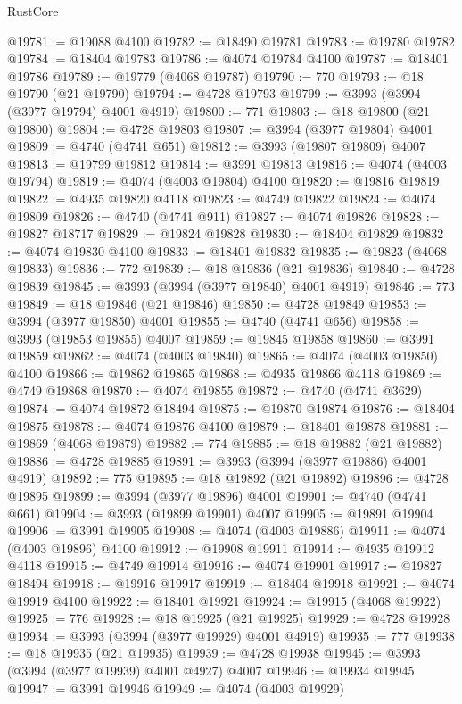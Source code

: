 \begin{lexlean}{RustCore}
\begin{coremodule}
@19781 := @19088 @4100
@19782 := @18490 @19781
@19783 := @19780 @19782
@19784 := @18404 @19783
@19786 := @4074 @19784 @4100
@19787 := @18401 @19786
@19789 := @19779 (@4068 @19787)
@19790 := 770
@19793 := @18 @19790 (@21 @19790)
@19794 := @4728 @19793
@19799 := @3993 (@3994 (@3977 @19794) @4001 @4919)
@19800 := 771
@19803 := @18 @19800 (@21 @19800)
@19804 := @4728 @19803
@19807 := @3994 (@3977 @19804) @4001
@19809 := @4740 (@4741 @651)
@19812 := @3993 (@19807 @19809) @4007
@19813 := @19799 @19812
@19814 := @3991 @19813
@19816 := @4074 (@4003 @19794)
@19819 := @4074 (@4003 @19804) @4100
@19820 := @19816 @19819
@19822 := @4935 @19820 @4118
@19823 := @4749 @19822
@19824 := @4074 @19809
@19826 := @4740 (@4741 @911)
@19827 := @4074 @19826
@19828 := @19827 @18717
@19829 := @19824 @19828
@19830 := @18404 @19829
@19832 := @4074 @19830 @4100
@19833 := @18401 @19832
@19835 := @19823 (@4068 @19833)
@19836 := 772
@19839 := @18 @19836 (@21 @19836)
@19840 := @4728 @19839
@19845 := @3993 (@3994 (@3977 @19840) @4001 @4919)
@19846 := 773
@19849 := @18 @19846 (@21 @19846)
@19850 := @4728 @19849
@19853 := @3994 (@3977 @19850) @4001
@19855 := @4740 (@4741 @656)
@19858 := @3993 (@19853 @19855) @4007
@19859 := @19845 @19858
@19860 := @3991 @19859
@19862 := @4074 (@4003 @19840)
@19865 := @4074 (@4003 @19850) @4100
@19866 := @19862 @19865
@19868 := @4935 @19866 @4118
@19869 := @4749 @19868
@19870 := @4074 @19855
@19872 := @4740 (@4741 @3629)
@19874 := @4074 @19872 @18494
@19875 := @19870 @19874
@19876 := @18404 @19875
@19878 := @4074 @19876 @4100
@19879 := @18401 @19878
@19881 := @19869 (@4068 @19879)
@19882 := 774
@19885 := @18 @19882 (@21 @19882)
@19886 := @4728 @19885
@19891 := @3993 (@3994 (@3977 @19886) @4001 @4919)
@19892 := 775
@19895 := @18 @19892 (@21 @19892)
@19896 := @4728 @19895
@19899 := @3994 (@3977 @19896) @4001
@19901 := @4740 (@4741 @661)
@19904 := @3993 (@19899 @19901) @4007
@19905 := @19891 @19904
@19906 := @3991 @19905
@19908 := @4074 (@4003 @19886)
@19911 := @4074 (@4003 @19896) @4100
@19912 := @19908 @19911
@19914 := @4935 @19912 @4118
@19915 := @4749 @19914
@19916 := @4074 @19901
@19917 := @19827 @18494
@19918 := @19916 @19917
@19919 := @18404 @19918
@19921 := @4074 @19919 @4100
@19922 := @18401 @19921
@19924 := @19915 (@4068 @19922)
@19925 := 776
@19928 := @18 @19925 (@21 @19925)
@19929 := @4728 @19928
@19934 := @3993 (@3994 (@3977 @19929) @4001 @4919)
@19935 := 777
@19938 := @18 @19935 (@21 @19935)
@19939 := @4728 @19938
@19945 := @3993 (@3994 (@3977 @19939) @4001 @4927) @4007
@19946 := @19934 @19945
@19947 := @3991 @19946
@19949 := @4074 (@4003 @19929)

\end{coremodule}
\end{lexlean}
